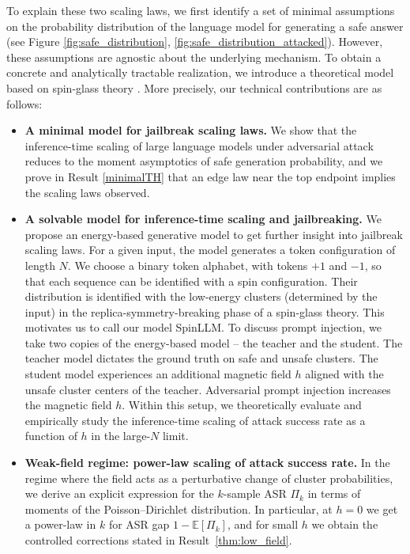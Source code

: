 \documentclass{article}
\theoremstyle{remark} %
\begin{document}
To explain these two scaling laws, we first identify a set of minimal assumptions on the probability distribution of the language model for generating a safe answer (see Figure \ref{fig:safe_distribution}, \ref{fig:safe_distribution_attacked}). 
However, these assumptions are agnostic about the underlying mechanism. To obtain a concrete and analytically tractable realization, we introduce a theoretical model based on spin-glass theory \citep{PhysRevLett.35.1792, PARISI1979203, PhysRevLett.43.1754}. 
More precisely, our technical contributions are as follows:
\begin{itemize}
\item \textbf{A minimal model for jailbreak scaling laws.}
We show that the inference-time scaling of large language models under adversarial attack reduces to the moment asymptotics of safe generation probability, and we prove in Result \ref{minimalTH} that an edge law near the top endpoint implies the scaling laws observed.
\item \textbf{A solvable model for inference-time scaling and jailbreaking.}
We propose an energy-based generative model to get further insight into jailbreak scaling laws. For a given input, the model generates a token configuration of length $N$. We choose a binary token alphabet, with tokens $+1$ and $-1$, so that each sequence can be identified with a spin configuration. Their distribution is identified with the low-energy clusters (determined by the input) in the replica-symmetry-breaking phase of a spin-glass theory. This motivates us to call our model SpinLLM.
To discuss prompt injection, we take two copies of the energy-based model -- the teacher and the student. The teacher model dictates the ground truth on safe and unsafe clusters.
The student model experiences an additional magnetic field $h$ aligned with the unsafe cluster centers of the teacher. Adversarial prompt injection increases the magnetic field $h$. Within this setup, we theoretically evaluate and empirically study the inference-time scaling of attack success rate as a function of $h$ in the large-$N$ limit. 
\item \textbf{Weak-field regime: power-law scaling of attack success rate.}
In the regime where the field acts as a perturbative change of cluster probabilities, we derive an explicit expression for the $k$-sample ASR $\Pi_k$ in terms of moments of the Poisson--Dirichlet distribution. In particular, at $h=0$ we get a power-law in $k$ for ASR gap $1-\mathbb{E}[\Pi_k]$, and for small $h$ we obtain the controlled corrections stated in Result~\ref{thm:low_field}.


\end{itemize}
\end{document}
